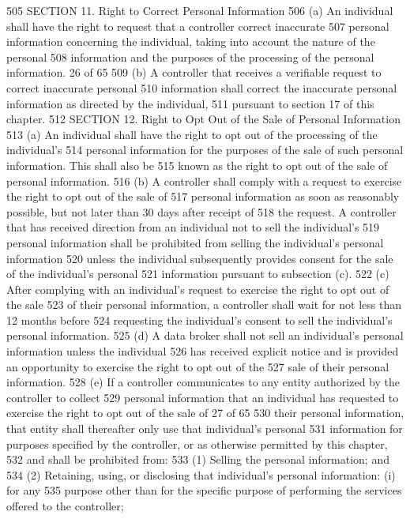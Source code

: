 505 SECTION 11. Right to Correct Personal Information
506 (a) An individual shall have the right to request that a controller correct inaccurate
507 personal information concerning the individual, taking into account the nature of the personal
508 information and the purposes of the processing of the personal information.
26 of 65
509 (b) A controller that receives a verifiable request to correct inaccurate personal
510 information shall correct the inaccurate personal information as directed by the individual,
511 pursuant to section 17 of this chapter.
512 SECTION 12. Right to Opt Out of the Sale of Personal Information
513 (a) An individual shall have the right to opt out of the processing of the individual’s
514 personal information for the purposes of the sale of such personal information. This shall also be
515 known as the right to opt out of the sale of personal information.
516 (b) A controller shall comply with a request to exercise the right to opt out of the sale of
517 personal information as soon as reasonably possible, but not later than 30 days after receipt of
518 the request. A controller that has received direction from an individual not to sell the individual’s
519 personal information shall be prohibited from selling the individual’s personal information
520 unless the individual subsequently provides consent for the sale of the individual’s personal
521 information pursuant to subsection (c).
522 (c) After complying with an individual’s request to exercise the right to opt out of the sale
523 of their personal information, a controller shall wait for not less than 12 months before
524 requesting the individual’s consent to sell the individual’s personal information.
525 (d) A data broker shall not sell an individual’s personal information unless the individual
526 has received explicit notice and is provided an opportunity to exercise the right to opt out of the
527 sale of their personal information.
528 (e) If a controller communicates to any entity authorized by the controller to collect
529 personal information that an individual has requested to exercise the right to opt out of the sale of
27 of 65
530 their personal information, that entity shall thereafter only use that individual’s personal
531 information for purposes specified by the controller, or as otherwise permitted by this chapter,
532 and shall be prohibited from:
533 (1) Selling the personal information; and
534 (2) Retaining, using, or disclosing that individual’s personal information: (i) for any
535 purpose other than for the specific purpose of performing the services offered to the controller;
